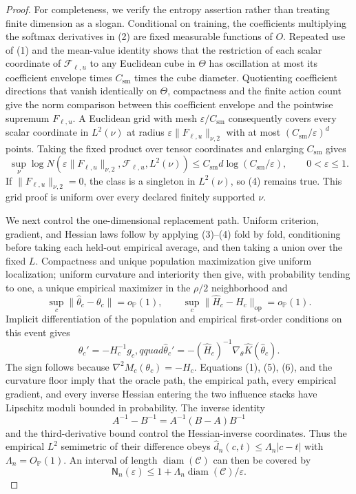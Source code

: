 \documentclass{article}
\begin{document}
\begin{proof}
For completeness, we verify the entropy assertion rather than treating finite dimension as a slogan.  Conditional on training, the coefficients multiplying the softmax derivatives in (2) are fixed measurable functions of \(O\).  Repeated use of (1) and the mean-value identity shows that the restriction of each scalar coordinate of \(\mathcal F_{\ell,u}\) to any Euclidean cube in \(\Theta\) has oscillation at most its coefficient envelope times \(C_{\mathrm{sm}}\) times the cube diameter.  Quotienting coefficient directions that vanish identically on \(\Theta\), compactness and the finite action count give the norm comparison between this coefficient envelope and the pointwise supremum \(F_{\ell,u}\).  A Euclidean grid with mesh \(\varepsilon/C_{\mathrm{sm}}\) consequently covers every scalar coordinate in \(L^2(\nu)\) at radius \(\varepsilon\|F_{\ell,u}\|_{\nu,2}\) with at most \((C_{\mathrm{sm}}/\varepsilon)^d\) points.  Taking the fixed product over tensor coordinates and enlarging \(C_{\mathrm{sm}}\) gives
\[
 \sup_\nu\log N\!\left(\varepsilon\|F_{\ell,u}\|_{\nu,2},
       \mathcal F_{\ell,u},L^2(\nu)\right)
 \leq C_{\mathrm{sm}}d\log(C_{\mathrm{sm}}/\varepsilon),
 \qquad 0<\varepsilon\leq1.                                 \tag{4}
\]
If \(\|F_{\ell,u}\|_{\nu,2}=0\), the class is a singleton in
\(L^2(\nu)\), so (4) remains true.  This grid proof is uniform over every declared finitely supported \(\nu\).

We next control the one-dimensional replacement path.  Uniform criterion, gradient, and Hessian laws follow by applying (3)--(4) fold by fold, conditioning before taking each held-out empirical average, and then taking a union over the fixed \(L\).  Compactness and unique population maximization give uniform localization; uniform curvature and interiority then give, with probability tending to one, a unique empirical maximizer in the \(\rho/2\) neighborhood and
\[
 \sup_c\|\widehat\theta_c-\theta_c\|=o_{\mathbb P}(1),\qquad
 \sup_c\|\widehat H_c-H_c\|_{\mathrm{op}}=o_{\mathbb P}(1). \tag{5}
\]
Implicit differentiation of the population and empirical first-order conditions on this event gives
\[
 \theta_c'=-H_c^{-1}g_c,qquad
 \widehat\theta_c'=-(\widehat H_c)^{-1}
                    \nabla_\theta\widehat K(\widehat\theta_c). \tag{6}
\]
The sign follows because \(\nabla^2M_c(\theta_c)=-H_c\).  Equations (1), (5), (6), and the curvature floor imply that the oracle path, the empirical path, every empirical gradient, and every inverse Hessian entering the two influence stacks have Lipschitz moduli bounded in probability.  The inverse identity
\[
 A^{-1}-B^{-1}=A^{-1}(B-A)B^{-1}                              \tag{7}
\]
and the third-derivative bound control the Hessian-inverse coordinates.  Thus the empirical \(L^2\) semimetric of their difference obeys
\(\widehat d_n(c,t)\leq\Lambda_n|c-t|\) with
\(\Lambda_n=O_{\mathbb P}(1)\).  An interval of length
\(\operatorname{diam}(\mathcal C)\) can then be covered by
\[
 \mathsf N_n(\varepsilon)
 \leq1+\Lambda_n\operatorname{diam}(\mathcal C)/\varepsilon. \tag{8}
\]


\end{proof}
\end{document}
